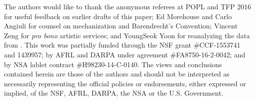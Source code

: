 
The authors would like to thank the anonymous referees at POPL and TFP 2016  for useful feedback on earlier drafts of this paper; Ed Morehouse and Carlo Angiuli for counsel on mechanization and Barendrecht's
Convention; Vincent Zeng for \textit{pro bono} artistic services; and YoungSeok Yoon for reanalyzing the data from \cite{6883030}. 
This work was partially funded through the NSF grant \#CCF-1553741 and 1439957; by AFRL and DARPA under agreement \#FA8750-16-2-0042; and by NSA lablet contract \#H98230-14-C-0140. The views and conclusions contained herein are those of the authors and should not be interpreted as necessarily representing the official policies or endorsements, either expressed or implied, of the NSF, AFRL, DARPA, the NSA or the U.S. Government.
